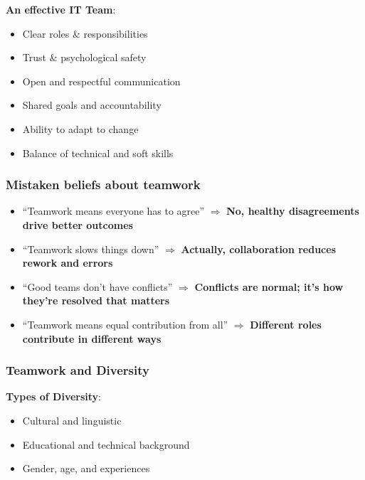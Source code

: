 \bigskip 

\noindent\textbf{An effective IT Team}:

\begin{itemize}
    \item Clear roles \& responsibilities
    \item Trust \& psychological safety
    \item Open and respectful communication
    \item Shared goals and accountability
    \item Ability to adapt to change
    \item Balance of technical and soft skills
\end{itemize}

\subsubsection{Mistaken beliefs about teamwork}

\begin{itemize}
    \item “Teamwork means everyone has to agree” $\Longrightarrow$ \textbf{No, healthy disagreements drive better outcomes}
    \item “Teamwork slows things down” $\Longrightarrow$ \textbf{Actually, collaboration reduces rework and errors}
    \item “Good teams don’t have conflicts” $\Longrightarrow$ \textbf{Conflicts are normal; it’s how they’re resolved that matters}
    \item “Teamwork means equal contribution from all” $\Longrightarrow$ \textbf{Different roles contribute in different ways}
\end{itemize}

\subsubsection{Teamwork and Diversity}

\indent 

\noindent\textbf{Types of Diversity}:

\begin{itemize}
    \item Cultural and linguistic
    \item Educational and technical background
    \item Gender, age, and experiences
\end{itemize}

\bigskip


